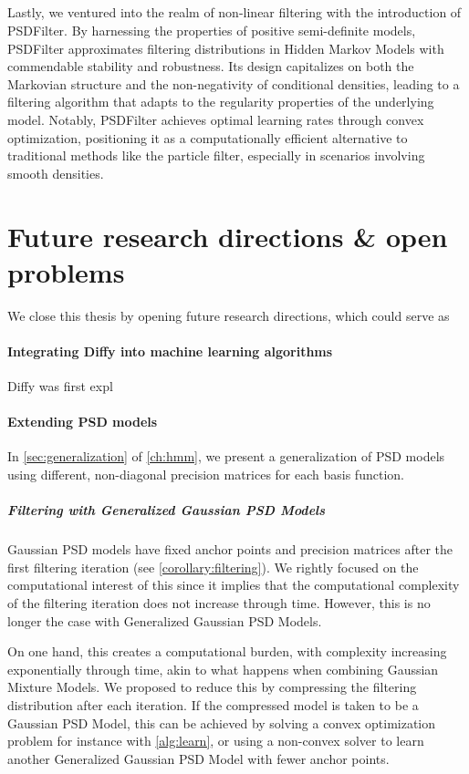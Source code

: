 \subparagraph{}Lastly, we ventured into the realm of non-linear filtering with the introduction of PSDFilter. By harnessing the properties of positive semi-definite models, PSDFilter approximates filtering distributions in Hidden Markov Models with commendable stability and robustness. Its design capitalizes on both the Markovian structure and the non-negativity of conditional densities, leading to a filtering algorithm that adapts to the regularity properties of the underlying model. Notably, PSDFilter achieves optimal learning rates through convex optimization, positioning it as a computationally efficient alternative to traditional methods like the particle filter, especially in scenarios involving smooth densities.

\section*{Future research directions \& open problems}

We close this thesis by opening future research directions, which could serve as

\paragraph{Integrating Diffy into machine learning algorithms} Diffy was first expl


\paragraph{Extending PSD models}
In \cref{sec:generalization} of \cref{ch:hmm}, we present a generalization of PSD models using different, non-diagonal precision matrices for each basis function.

\subparagraph{Filtering with Generalized Gaussian PSD Models} Gaussian PSD models have fixed anchor points and precision matrices after the first filtering iteration (see \cref{corollary:filtering}). We rightly focused on the computational interest of this since it implies that the computational complexity of the filtering iteration does not increase through time. However, this is no longer the case with Generalized Gaussian PSD Models.

On one hand, this creates a computational burden, with complexity increasing exponentially through time, akin to what happens when combining Gaussian Mixture Models. We proposed to reduce this by compressing the filtering distribution after each iteration. If the compressed model is taken to be a Gaussian PSD Model, this can be achieved by solving a convex optimization problem for instance with \cref{alg:learn}, or using a non-convex solver to learn another Generalized Gaussian PSD Model with fewer anchor points.

